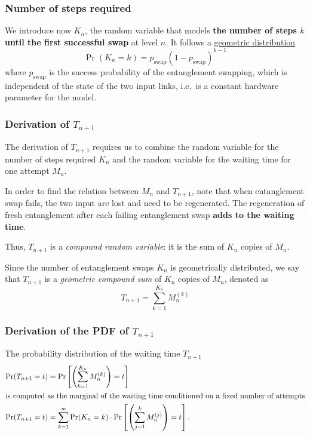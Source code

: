 \documentclass{masterthesis}
\begin{document}
\subsubsection*{Number of steps required}

We introduce now $K_n$, the random variable that models \textbf{the number of steps $k$ until the first successful swap} at level $n$. It follows a \hyperref[subsection:geometric_pdf]{geometric distribution}
\begin{equation}\label{eq:pdf_swap_steps}
    \Pr(K_n = k) = p_\text{swap} {(1 - p_\text{swap})}^{k-1}
\end{equation}
where $p_\text{swap}$ is the success probability of the entanglement swapping, which is independent of the state of the two input links, i.e.\ is a constant hardware parameter for the model.

\subsubsection*{Derivation of $T_{n+1}$}
The derivation of $T_{n+1}$ requires us to combine the random variable for the number of steps required $K_n$ and the random variable for the waiting time for one attempt $M_n$.

In order to find the relation between $M_n$ and $T_{n+1}$, note that when entanglement swap fails, the two input are lost and need to be
regenerated. The regeneration of fresh entanglement after each failing entanglement swap \textbf{adds to the waiting time}. 

Thus, $T_{n+1}$ is a \textit{compound random variable}: it is the sum of $K_n$ copies of $M_n$. 

Since the number of entanglement swaps $K_n$ is geometrically distributed, we say that $T_{n+1}$ is a \textit{geometric compound sum} of $K_n$ copies of $M_n$, denoted as
\begin{equation}
    T_{n+1}=\sum_{k=1}^{K_{n}} M_{n}^{(k)}
\end{equation}

\subsubsection*{Derivation of the PDF of $T_{n+1}$}

The probability distribution of the waiting time $T_{n+1}$
\begin{align}
    \Pr(T_{n+1} = t) &= \Pr\left[\left(\sum_{k=1}^{K_{n}} M_{n}^{(k)}\right) = t\right] \nonumber \\
    \intertext{is computed as the marginal of the waiting time conditioned on a fixed number of attempts}
    \Pr(T_{n+1} = t) &= \sum_{k=1}^{\infty} \Pr(K_{n} = k) \cdot \Pr\left[\left( \sum_{j=1}^{k} M_{n}^{(j)} \right) = t\right].
\end{align}
\end{document}

